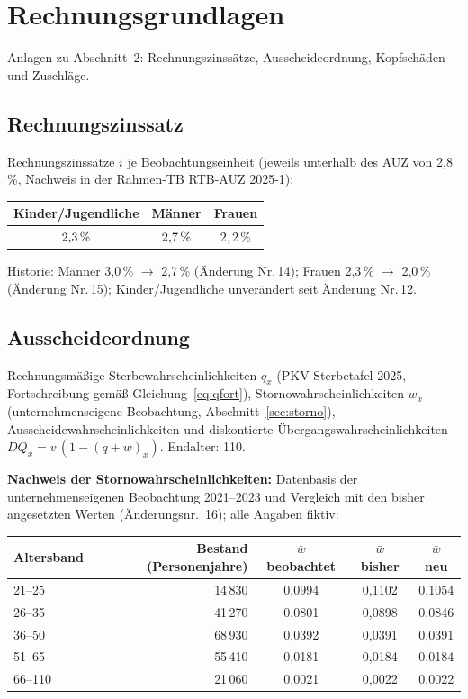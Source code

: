 \section{Rechnungsgrundlagen}\label{sec:anlagenteil2}

Anlagen zu Abschnitt~2: Rechnungszinssätze, Ausscheideordnung,
Kopfschäden und Zuschläge.

\subsection{Rechnungszinssatz}\label{sec:anlage21}

Rechnungszinssätze $i$ je Beobachtungseinheit (jeweils unterhalb des
AUZ von 2{,}8\,\%, Nachweis in der Rahmen-TB RTB-AUZ 2025-1):

\begin{center}
\begin{tabular}{ccc}
\toprule
Kinder/Jugendliche & Männer & Frauen \\
\midrule
$2{,}3\,\%$ & $2{,}7\,\%$ & $2{,}2\,\%$ \\
\bottomrule
\end{tabular}
\end{center}

Historie: Männer 3{,}0\,\% $\to$ 2{,}7\,\% (Änderung Nr.\,14); Frauen
2{,}3\,\% $\to$ 2{,}0\,\% (Änderung Nr.\,15); Kinder/Jugendliche
unverändert seit Änderung Nr.\,12.

\subsection{Ausscheideordnung}\label{sec:anlage221}

Rechnungsmäßige Sterbewahrscheinlichkeiten $q_x$ (PKV-Sterbetafel 2025,
Fortschreibung gemäß Gleichung~\eqref{eq:qfort}),
Stornowahrscheinlichkeiten $w_x$ (unternehmenseigene Beobachtung,
Abschnitt~\ref{sec:storno}), Ausscheidewahrscheinlichkeiten und
diskontierte Übergangswahrscheinlichkeiten
$DQ_x = v\,(1-(q+w)_x)$. Endalter: 110.

\textbf{Nachweis der Stornowahrscheinlichkeiten:} Datenbasis der
unternehmenseigenen Beobachtung 2021--2023 und Vergleich mit den
bisher angesetzten Werten (Änderungsnr.~16); alle Angaben fiktiv:

\begin{center}\small
\begin{tabular}{@{}lrccc@{}}
\toprule
Altersband & Bestand (Personenjahre) & $\bar{w}$ beobachtet & $\bar{w}$ bisher & $\bar{w}$ neu \\
\midrule
21--25 & 14\,830 & 0{,}0994 & 0{,}1102 & 0{,}1054 \\
26--35 & 41\,270 & 0{,}0801 & 0{,}0898 & 0{,}0846 \\
36--50 & 68\,930 & 0{,}0392 & 0{,}0391 & 0{,}0391 \\
51--65 & 55\,410 & 0{,}0181 & 0{,}0184 & 0{,}0184 \\
66--110 & 21\,060 & 0{,}0021 & 0{,}0022 & 0{,}0022 \\
\bottomrule
\end{tabular}
\end{center}

